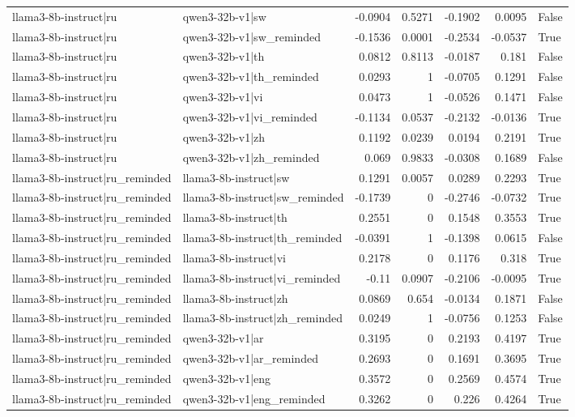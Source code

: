 \begin{table}
\begin{tabular}{l l r r r r l}
llama3-8b-instruct|ru & qwen3-32b-v1|sw & -0.0904 & 0.5271 & -0.1902 & 0.0095 & False \\
llama3-8b-instruct|ru & qwen3-32b-v1|sw_reminded & -0.1536 & 0.0001 & -0.2534 & -0.0537 & True \\
llama3-8b-instruct|ru & qwen3-32b-v1|th & 0.0812 & 0.8113 & -0.0187 & 0.181 & False \\
llama3-8b-instruct|ru & qwen3-32b-v1|th_reminded & 0.0293 & 1 & -0.0705 & 0.1291 & False \\
llama3-8b-instruct|ru & qwen3-32b-v1|vi & 0.0473 & 1 & -0.0526 & 0.1471 & False \\
llama3-8b-instruct|ru & qwen3-32b-v1|vi_reminded & -0.1134 & 0.0537 & -0.2132 & -0.0136 & True \\
llama3-8b-instruct|ru & qwen3-32b-v1|zh & 0.1192 & 0.0239 & 0.0194 & 0.2191 & True \\
llama3-8b-instruct|ru & qwen3-32b-v1|zh_reminded & 0.069 & 0.9833 & -0.0308 & 0.1689 & False \\
llama3-8b-instruct|ru_reminded & llama3-8b-instruct|sw & 0.1291 & 0.0057 & 0.0289 & 0.2293 & True \\
llama3-8b-instruct|ru_reminded & llama3-8b-instruct|sw_reminded & -0.1739 & 0 & -0.2746 & -0.0732 & True \\
llama3-8b-instruct|ru_reminded & llama3-8b-instruct|th & 0.2551 & 0 & 0.1548 & 0.3553 & True \\
llama3-8b-instruct|ru_reminded & llama3-8b-instruct|th_reminded & -0.0391 & 1 & -0.1398 & 0.0615 & False \\
llama3-8b-instruct|ru_reminded & llama3-8b-instruct|vi & 0.2178 & 0 & 0.1176 & 0.318 & True \\
llama3-8b-instruct|ru_reminded & llama3-8b-instruct|vi_reminded & -0.11 & 0.0907 & -0.2106 & -0.0095 & True \\
llama3-8b-instruct|ru_reminded & llama3-8b-instruct|zh & 0.0869 & 0.654 & -0.0134 & 0.1871 & False \\
llama3-8b-instruct|ru_reminded & llama3-8b-instruct|zh_reminded & 0.0249 & 1 & -0.0756 & 0.1253 & False \\
llama3-8b-instruct|ru_reminded & qwen3-32b-v1|ar & 0.3195 & 0 & 0.2193 & 0.4197 & True \\
llama3-8b-instruct|ru_reminded & qwen3-32b-v1|ar_reminded & 0.2693 & 0 & 0.1691 & 0.3695 & True \\
llama3-8b-instruct|ru_reminded & qwen3-32b-v1|eng & 0.3572 & 0 & 0.2569 & 0.4574 & True \\
llama3-8b-instruct|ru_reminded & qwen3-32b-v1|eng_reminded & 0.3262 & 0 & 0.226 & 0.4264 & True \\

\end{tabular}
\end{table}
